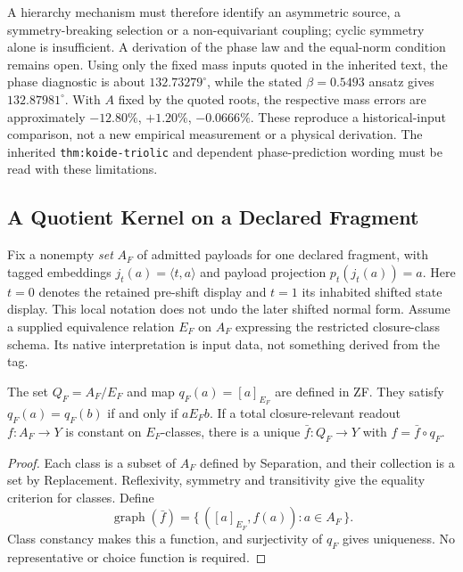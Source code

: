A hierarchy mechanism must therefore identify an asymmetric source,
a symmetry-breaking selection or a non-equivariant coupling; cyclic
symmetry alone is insufficient. A derivation of the phase law and the
equal-norm condition remains open. Using only the fixed mass inputs
quoted in the inherited text, the phase diagnostic is about
$132.73279^\circ$, while the stated $\beta=0.5493$ ansatz gives
$132.87981^\circ$. With $A$ fixed by the quoted roots, the respective
mass errors are approximately $-12.80\%$, $+1.20\%$, $-0.0666\%$.
These reproduce a historical-input comparison, not a new empirical
measurement or a physical derivation. The inherited
\texttt{thm:koide-triolic} and dependent phase-prediction wording
must be read with these limitations.

\subsection{A Quotient Kernel on a Declared Fragment}
\label{v480:kernel-fragment}

Fix a nonempty \emph{set} $A_F$ of admitted payloads for one declared
fragment, with tagged embeddings $j_t(a)=\langle t,a\rangle$ and
payload projection $p_t(j_t(a))=a$. Here $t=0$ denotes the retained
pre-shift display and $t=1$ its inhabited shifted state display.
This local notation does not undo the later shifted normal form.
Assume a supplied equivalence relation $E_F$ on $A_F$ expressing
the restricted closure-class schema. Its native interpretation is
input data, not something derived from the tag.

\begin{proposition}
\label{v480:kernel-quotient}
The set $Q_F=A_F/E_F$ and map $q_F(a)=[a]_{E_F}$ are defined in ZF.
They satisfy $q_F(a)=q_F(b)$ if and only if $aE_Fb$.
If a total closure-relevant readout $f:A_F\to Y$ is constant on
$E_F$-classes, there is a unique $\bar f:Q_F\to Y$ with
$f=\bar f\circ q_F$.
\end{proposition}
\begin{proof}
Each class is a subset of $A_F$ defined by Separation, and their
collection is a set by Replacement. Reflexivity, symmetry and
transitivity give the equality criterion for classes. Define
\[
 \operatorname{graph}(\bar f)
 =\{\,([a]_{E_F},f(a)):a\in A_F\,\}.
\]
Class constancy makes this a function, and surjectivity of $q_F$
gives uniqueness. No representative or choice function is required.
\end{proof}

